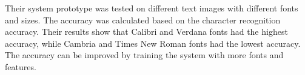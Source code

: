 Their system prototype was tested on different text images with different fonts and sizes. The accuracy was calculated based on the character recognition accuracy. Their results show that Calibri and Verdana fonts had the highest accuracy, while Cambria and Times New Roman fonts had the lowest accuracy.  The accuracy can be improved by training the system with more fonts and features. \cite{hossainOpticalCharacterRecognition2019}


